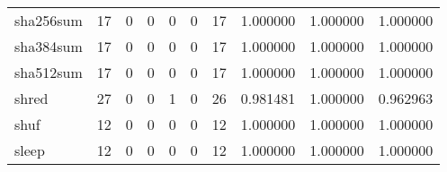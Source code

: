 \begin{tabular}{lrrrrrrrrr}
sha256sum &                                      17 &                                                  0 &                                                  0 &                                                  0 &                                                  0 &                                                 17 &                                           1.000000 &                               1.000000 &                             1.000000 \\
sha384sum &                                      17 &                                                  0 &                                                  0 &                                                  0 &                                                  0 &                                                 17 &                                           1.000000 &                               1.000000 &                             1.000000 \\
sha512sum &                                      17 &                                                  0 &                                                  0 &                                                  0 &                                                  0 &                                                 17 &                                           1.000000 &                               1.000000 &                             1.000000 \\
shred     &                                      27 &                                                  0 &                                                  0 &                                                  1 &                                                  0 &                                                 26 &                                           0.981481 &                               1.000000 &                             0.962963 \\
shuf      &                                      12 &                                                  0 &                                                  0 &                                                  0 &                                                  0 &                                                 12 &                                           1.000000 &                               1.000000 &                             1.000000 \\
sleep     &                                      12 &                                                  0 &                                                  0 &                                                  0 &                                                  0 &                                                 12 &                                           1.000000 &                               1.000000 &                             1.000000 \\

\end{tabular}
